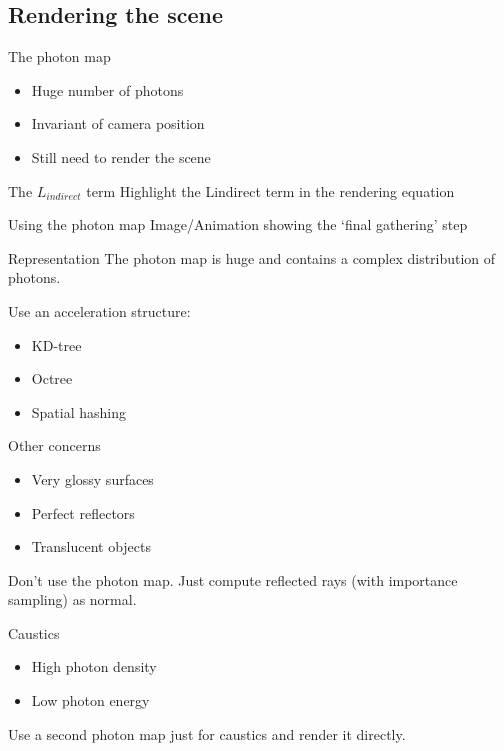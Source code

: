 \documentclass{beamer}
\begin{document}
		\subsection{Rendering the scene}
			\begin{frame}{The photon map}
				\begin{itemize}
					\item<2-> Huge number of photons
					\item<3-> Invariant of camera position
					\item<4-> Still need to render the scene
				\end{itemize}
			\end{frame}
			\begin{frame}{The \(L_{indirect}\) term}
				Highlight the Lindirect term in the rendering equation
			\end{frame}
			\begin{frame}{Using the photon map}
				Image/Animation showing the `final gathering' step
			\end{frame}
			\begin{frame}{Representation}
				The photon map is huge and contains a complex distribution of photons.

				Use an acceleration structure:
				\begin{itemize}
					\item<2-> KD-tree
					\item<3-> Octree
					\item<4-> Spatial hashing
				\end{itemize}
			\end{frame}
			\begin{frame}{Other concerns}
				\begin{itemize}
					\item<2-> Very glossy surfaces
					\item<3-> Perfect reflectors
					\item<4-> Translucent objects
				\end{itemize}
				\pause Don't use the photon map. Just compute reflected rays (with importance sampling) as normal.
			\end{frame}
			\begin{frame}{Caustics}
				\begin{itemize}
					\item<2-> High photon density
					\item<3-> Low photon energy
				\end{itemize}

				Use a second photon map just for caustics and render it directly.
			\end{frame}
\end{document}
